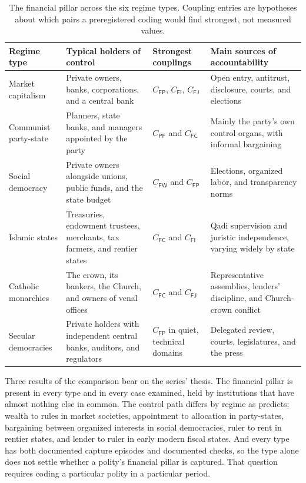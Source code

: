 \documentclass[11pt,letterpaper]{article}
\theoremstyle{definition}
\theoremstyle{remark}
\newcommand{\pF}{\mathsf{F}}
\newcommand{\pP}{\mathsf{P}}
\newcommand{\pJ}{\mathsf{J}}
\newcommand{\pI}{\mathsf{I}}
\newcommand{\pC}{\mathsf{C}}
\newcommand{\pW}{\mathsf{W}}
\begin{document}
\begin{table}[t]
\centering
\small
\caption{The financial pillar across the six regime types. Coupling entries are hypotheses about which pairs a preregistered coding would find strongest, not measured values.}
\label{tab:regimes}
\begin{tabularx}{\linewidth}{@{}L{2.2cm}YL{2.1cm}Y@{}}
\toprule
Regime type & Typical holders of control & Strongest couplings & Main sources of accountability \\
\midrule
Market capitalism & Private owners, banks, corporations, and a central bank & $C_{\pF\pP}$, $C_{\pF\pI}$, $C_{\pF\pJ}$ & Open entry, antitrust, disclosure, courts, and elections \\
Communist party-state & Planners, state banks, and managers appointed by the party & $C_{\pP\pF}$ and $C_{\pF\pC}$ & Mainly the party's own control organs, with informal bargaining \\
Social democracy & Private owners alongside unions, public funds, and the state budget & $C_{\pF\pW}$ and $C_{\pF\pP}$ & Elections, organized labor, and transparency norms \\
Islamic states & Treasuries, endowment trustees, merchants, tax farmers, and rentier states & $C_{\pF\pC}$ and $C_{\pF\pI}$ & Qadi supervision and juristic independence, varying widely by state \\
Catholic monarchies & The crown, its bankers, the Church, and owners of venal offices & $C_{\pF\pC}$ and $C_{\pF\pJ}$ & Representative assemblies, lenders' discipline, and Church-crown conflict \\
Secular democracies & Private holders with independent central banks, auditors, and regulators & $C_{\pF\pP}$ in quiet, technical domains & Delegated review, courts, legislatures, and the press \\
\bottomrule
\end{tabularx}
\end{table}

Three results of the comparison bear on the series' thesis. The financial pillar is present in every type and in every case examined, held by institutions that have almost nothing else in common. The control path differs by regime as \citet{largo2026hbs} predicts: wealth to rules in market societies, appointment to allocation in party-states, bargaining between organized interests in social democracies, ruler to rent in rentier states, and lender to ruler in early modern fiscal states. And every type has both documented capture episodes and documented checks, so the type alone does not settle whether a polity's financial pillar is captured. That question requires coding a particular polity in a particular period.
\end{document}
